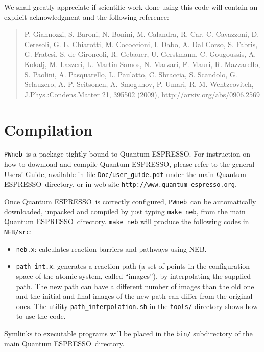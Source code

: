 \documentclass[12pt,a4paper]{article}
\def\qe{{\sc Quantum ESPRESSO}}
\def\NEB{\texttt{PWneb}} %
\def\nebx{\texttt{neb.x}}
\begin{document}
We shall greatly appreciate if scientific work done using this code will 
contain an explicit acknowledgment and the following reference:
\begin{quote}
P. Giannozzi, S. Baroni, N. Bonini, M. Calandra, R. Car, C. Cavazzoni,
D. Ceresoli, G. L. Chiarotti, M. Cococcioni, I. Dabo, A. Dal Corso,
S. Fabris, G. Fratesi, S. de Gironcoli, R. Gebauer, U. Gerstmann,
C. Gougoussis, A. Kokalj, M. Lazzeri, L. Martin-Samos, N. Marzari,
F. Mauri, R. Mazzarello, S. Paolini, A. Pasquarello, L. Paulatto,
C. Sbraccia, S. Scandolo, G. Sclauzero, A. P. Seitsonen, A. Smogunov,
P. Umari, R. M. Wentzcovitch, J.Phys.:Condens.Matter 21, 395502 (2009),
http://arxiv.org/abs/0906.2569
\end{quote}

\section{Compilation}

\NEB\ is a package tightly bound to \qe.
For instruction on how to download and compile \qe, please refer 
to the general Users' Guide, available in file \texttt{Doc/user\_guide.pdf}
under the main \qe\ directory, or in web site 
\texttt{http://www.quantum-espresso.org}.

Once \qe\ is correctly configured, \NEB\ can be automatically 
downloaded, unpacked and compiled by
just typing \texttt{make neb}, from the main \qe\ directory.
\texttt{make neb} will produce 
the following codes in \texttt{NEB/src}:
\begin{itemize}
\item \nebx: calculates reaction barriers and pathways using NEB.
\item \texttt{path\_int.x}: generates a reaction path (a set of points
in the configuration space of the atomic system, called ``images''), by
 interpolating the supplied path. The new path can have a 
 different number of images than the old one and the initial and final 
 images of the new path can differ from the original ones.
 The utility \texttt{path\_interpolation.sh} in the \texttt{tools/}
 directory shows how to use the code.
\end{itemize}

Symlinks to executable programs will be placed in the
\texttt{bin/} subdirectory of the main \qe\  directory.
\end{document}
